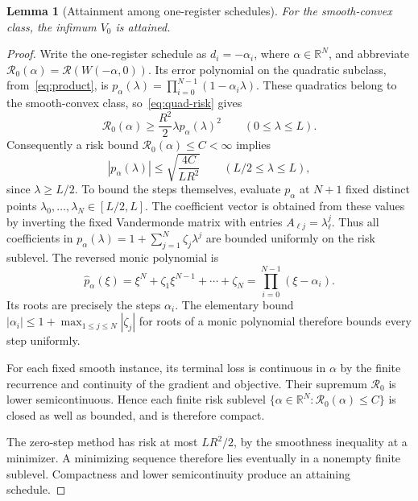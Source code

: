 \documentclass[11pt]{article}
\numberwithin{equation}{section}
\newtheorem{lemma}[theorem]{Lemma}
\theoremstyle{definition}
\newcommand{\R}{\mathbb R}
\newcommand{\risk}{\mathcal R}
\begin{document}
\begin{lemma}[Attainment among one-register schedules]\label{lem:compact}
For the smooth-convex class, the infimum $V_0$ is attained.
\end{lemma}
\begin{proof}
Write the one-register schedule as $d_i=-\alpha_i$, where $\alpha\in\R^N$, and abbreviate $\risk_0(\alpha)=\risk(W(-\alpha,0))$. Its error polynomial on the quadratic subclass, from~\eqref{eq:product}, is
$p_\alpha(\lambda)=\prod_{i=0}^{N-1}(1-\alpha_i\lambda)$.
These quadratics belong to the smooth-convex class, so~\eqref{eq:quad-risk} gives
\[
 \risk_0(\alpha)\ge\frac{R^2}{2}\lambda p_\alpha(\lambda)^2
 \qquad(0\le\lambda\le L).
\]
Consequently a risk bound $\risk_0(\alpha)\le C<\infty$ implies
\[
 |p_\alpha(\lambda)|\le\sqrt{\frac{4C}{LR^2}}
 \qquad(L/2\le\lambda\le L),
\]
since $\lambda\ge L/2$. To bound the steps themselves, evaluate $p_\alpha$ at $N+1$ fixed distinct points $\lambda_0,\ldots,\lambda_N\in[L/2,L]$. The coefficient vector is obtained from these values by inverting the fixed Vandermonde matrix with entries $A_{\ell j}=\lambda_\ell^j$. Thus all coefficients in $p_\alpha(\lambda)=1+\sum_{j=1}^N\zeta_j\lambda^j$ are bounded uniformly on the risk sublevel. The reversed monic polynomial is
\[
 \widehat p_\alpha(\xi)=\xi^N+\zeta_1\xi^{N-1}+\cdots+\zeta_N
 =\prod_{i=0}^{N-1}(\xi-\alpha_i).
\]
Its roots are precisely the steps $\alpha_i$. The elementary bound
$|\alpha_i|\le1+\max_{1\le j\le N}|\zeta_j|$ for roots of a monic polynomial therefore bounds every step uniformly.

For each fixed smooth instance, its terminal loss is continuous in $\alpha$ by the finite recurrence and continuity of the gradient and objective. Their supremum $\risk_0$ is lower semicontinuous. Hence each finite risk sublevel $\{\alpha\in\R^N:\risk_0(\alpha)\le C\}$ is closed as well as bounded, and is therefore compact.

The zero-step method has risk at most $LR^2/2$, by the smoothness inequality at a minimizer. A minimizing sequence therefore lies eventually in a nonempty finite sublevel. Compactness and lower semicontinuity produce an attaining schedule.
\end{proof}
\end{document}
